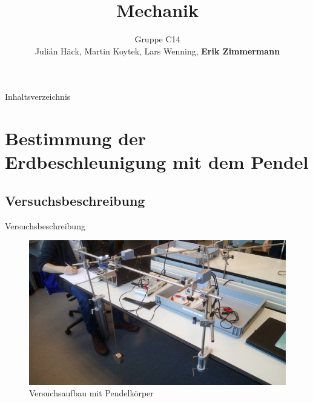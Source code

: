 \documentclass[11pt]{beamer}
\author{Gruppe C14 \\ Julián Häck, Martin Koytek, Lars Wenning, \textbf{Erik Zimmermann}}
\title{Mechanik}
\begin{document}
\begin{frame}
\titlepage
\end{frame}

\begin{frame}{Inhaltsverzeichnis}
\tableofcontents
\end{frame}

\section{Bestimmung der Erdbeschleunigung mit dem Pendel}
\subsection{Versuchsbeschreibung}
\begin{frame}{Versuchsbeschreibung}
\begin{figure}[H]
\centering
\includegraphics[scale=0.06]{Bilder/Einzelpendel.jpg}
\caption{Versuchsaufbau mit Pendelkörper}
\end{figure}
\end{frame}
\end{document}
